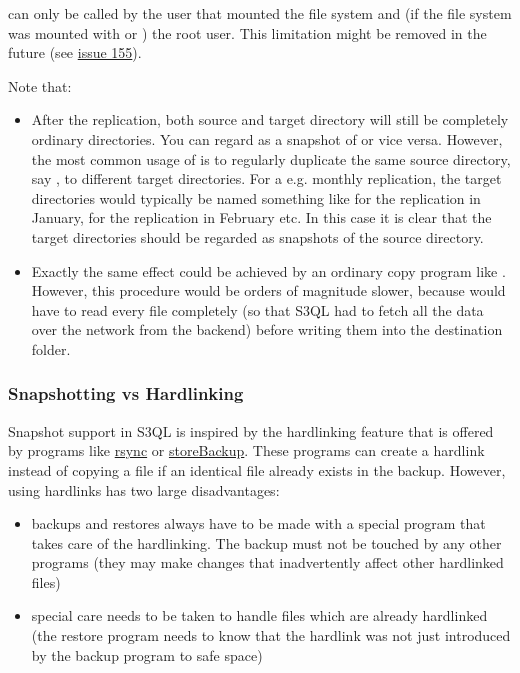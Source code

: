 \documentclass[letterpaper,10pt,english]{sphinxmanual}
\begin{document}
 can only be called by the user that mounted the file system
and (if the file system was mounted with  or )
the root user. This limitation might be removed in the future (see \href{http://code.google.com/p/s3ql/issues/detail?id=155}{issue 155}).

Note that:
\begin{itemize}
\item {} 
After the replication, both source and target directory will still
be completely ordinary directories. You can regard  as a
snapshot of  or vice versa. However, the most common
usage of  is to regularly duplicate the same source
directory, say , to different target directories. For a
e.g. monthly replication, the target directories would typically be
named something like  for the replication in
January,  for the replication in February etc.
In this case it is clear that the target directories should be
regarded as snapshots of the source directory.

\item {} 
Exactly the same effect could be achieved by an ordinary copy
program like . However, this procedure would be orders of
magnitude slower, because  would have to read every file
completely (so that S3QL had to fetch all the data over the network
from the backend) before writing them into the destination folder.

\end{itemize}


\subsubsection{Snapshotting vs Hardlinking}
\label{man/cp:snapshotting-vs-hardlinking}
Snapshot support in S3QL is inspired by the hardlinking feature that
is offered by programs like \href{http://www.samba.org/rsync}{rsync} or
\href{http://savannah.nongnu.org/projects/storebackup}{storeBackup}.
These programs can create a hardlink instead of copying a file if an
identical file already exists in the backup. However, using hardlinks
has two large disadvantages:
\begin{itemize}
\item {} 
backups and restores always have to be made with a special program
that takes care of the hardlinking. The backup must not be touched
by any other programs (they may make changes that inadvertently
affect other hardlinked files)

\item {} 
special care needs to be taken to handle files which are already
hardlinked (the restore program needs to know that the hardlink was
not just introduced by the backup program to safe space)

\end{itemize}
\end{document}
